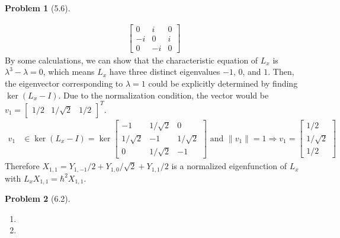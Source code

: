 \documentclass[twoside,11pt]{article}
\theoremstyle{definition}
\newtheorem{problem}{Problem}
\theoremstyle{remark}
\begin{document}
\begin{problem}[5.6]
\begin{enumerate}[label=(\alph*)]
\begin{align*}
\begin{bmatrix}
                0 & i & 0\\
                -i & 0 & i\\
                0 & -i & 0
            \end{bmatrix}
        \end{align*}
        By some calculations, we can show that the characteristic equation of
        $L_x$ is $\lambda^3 - \lambda=0$, which means $L_x$ have three distinct
        eigenvalues $-1$, $0$, and $1$.
        Then, the eigenvector corresponding to $\lambda=1$ could be explicitly determined by
        finding $\ker (L_x - I)$. Due to the normalization condition, the vector would
        be $v_1 = \begin{bmatrix} 1/2 & 1/\sqrt{2} & 1/2\end{bmatrix}^T$.
        \begin{align*}
            v_1&\in\ker (L_x-I) = \ker\begin{bmatrix}
                -1 & 1/\sqrt{2} & 0\\
                1/\sqrt{2} & -1 & 1/\sqrt{2}\\
                0 & 1/\sqrt{2} & -1
            \end{bmatrix}  \text{ and } \|v_1\| = 1
            \Rightarrow v_1 = \begin{bmatrix}
                1/2 \\ 1/\sqrt{2} \\ 1/2
            \end{bmatrix}
        \end{align*}
        Therefore $X_{1,1} = Y_{1,-1}/2 + Y_{1,0}/\sqrt{2} + Y_{1,1}/2$ is a normalized eigenfunction
        of $L_x$ with $L_x X_{1,1} = \hbar^2 X_{1,1}$.
    \end{enumerate}
\end{problem}


\begin{problem}[6.2]\
    \begin{enumerate}[label=(\alph*)]
        \item 


        \item 

    \end{enumerate}
\end{problem}








\end{document}
